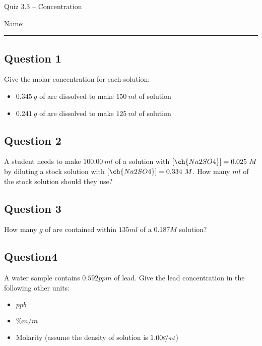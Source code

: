 \documentclass[11pt, letterpaper]{memoir}
\begin{document}
	\begin{center}
		{\large	Quiz 3.3 -- Concentration}
	\end{center}
{\large Name: \rule[-1mm]{4in}{.1pt}
	
	\subsection*{Question 1}
	Give the molar concentration for each solution:	
	\begin{itemize}
		\item $0.345~g$ of  are dissolved to make $150~ml$ of solution

      \vspace{2em}
		\item $0.241~g$ of  are dissolved to make $125~ml$ of solution
	\end{itemize}
	
	\vspace{1em}
	\subsection*{Question 2}
	A student needs to make $100.00~ml$ of a solution with $\left[\ch{Na2SO4}\right] = 0.025~M$ by diluting a stock solution with $\left[\ch{Na2SO4}\right] = 0.334~M$. How many $ml$ of the stock solution should they use?
	
	\vspace{6em}
	\subsection*{Question 3} 
  How many $g$ of  are contained within $135ml$ of a $0.187M$  solution?

  \vspace{4em}
  \subsection*{Question4}
  A water sample contains $0.592ppm$ of lead. Give the lead concentration in the following other units:
  \begin{itemize}
    \item $ppb$
      
      \vspace{2em}
    \item $\%m/m$
      
      \vspace{2em}
    \item Molarity (assume the density of solution is $1.00\nicefrac{g}{ml}$)
  \end{itemize}
\newpage
\pagestyle{empty}
\addtocounter{page}{-1}
}
\end{document}
